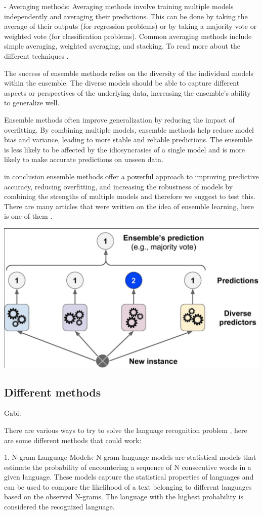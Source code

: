 \documentclass[a4paper]{article}
\begin{document}
- Averaging methods: Averaging methods involve training multiple models independently and averaging their predictions. This can be done by taking the average of their outputs (for regression problems) or by taking a majority vote or weighted vote (for classification problems). Common averaging methods include simple averaging, weighted averaging, and stacking. To read more about the different techniques \cite{sagi2018ensemble}. 

The success of ensemble methods relies on the diversity of the individual models within the ensemble. The diverse models should be able to capture different aspects or perspectives of the underlying data, increasing the ensemble's ability to generalize well.

Ensemble methods often improve generalization by reducing the impact of overfitting. By combining multiple models, ensemble methods help reduce model bias and variance, leading to more stable and reliable predictions. The ensemble is less likely to be affected by the idiosyncrasies of a single model and is more likely to make accurate predictions on unseen data.

in conclusion ensemble methods offer a powerful approach to improving predictive accuracy, reducing overfitting, and increasing the robustness of models by combining the strengths of multiple models and therefore we suggest to test this. There are many articles that were written on the idea of ensemble learning, here is one of them \cite{dietterich2002ensemble}.\newline

\includegraphics[width=.4\textwidth]{ensamble.png}

\subsection{Different methods}

Gabi:

There are various ways to try to solve the language recognition problem , here are some different methods that could work:

1. N-gram Language Models: N-gram language models are statistical models that estimate the probability of encountering a sequence of N consecutive words in a given language. These models capture the statistical properties of languages and can be used to compare the likelihood of a text belonging to different languages based on the observed N-grams. The language with the highest probability is considered the recognized language.
\end{document}
